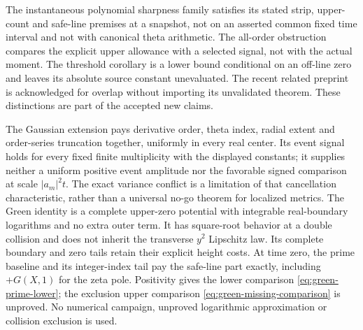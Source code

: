 The instantaneous polynomial sharpness family satisfies its stated strip,
upper-count and safe-line premises at a snapshot, not on an asserted
common fixed time interval and not with canonical theta arithmetic.
The all-order obstruction compares the explicit upper allowance with a
selected signal, not with the actual moment. The threshold corollary is
a lower bound conditional on an off-line zero and leaves its absolute
source constant unevaluated. The recent related preprint is acknowledged
for overlap without importing its unvalidated theorem. These distinctions
are part of the accepted new claims.

The Gaussian extension pays derivative order, theta index, radial extent
and order-series truncation together, uniformly in every real center.
Its event signal holds for every fixed finite multiplicity with the
displayed constants; it supplies neither a uniform positive event
amplitude nor the favorable signed comparison at scale \(|a_m|^2t\).
The exact variance conflict is a limitation of that cancellation
characteristic, rather than a universal no-go theorem for localized
metrics. The Green identity is a complete upper-zero potential with
integrable real-boundary logarithms and no extra outer term. It has
square-root behavior at a double collision and does not inherit the
transverse \(y^2\) Lipschitz law. Its complete boundary and zero tails
retain their explicit height costs. At time zero, the prime baseline
and its integer-index tail pay the safe-line part exactly, including
\(+G(X,1)\) for the zeta pole. Positivity gives the lower comparison
\eqref{eq:green-prime-lower}; the exclusion upper comparison
\eqref{eq:green-missing-comparison} is unproved. No numerical campaign,
unproved logarithmic approximation or collision exclusion is used.
